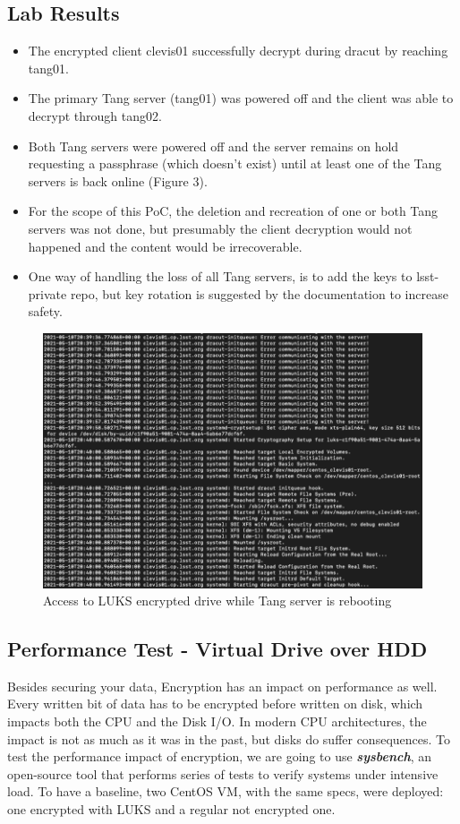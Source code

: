 \newpage
\subsection{Lab Results}
\begin{itemize}
  \item The encrypted client clevis01 successfully decrypt during dracut by reaching tang01.
  \item The primary Tang server (tang01) was powered off and the client was able to decrypt through tang02.
  \item Both Tang servers were powered off and the server remains on hold requesting a passphrase (which doesn't exist) until at least one of the Tang servers is back online (Figure 3).
  \item For the scope of this PoC, the deletion and recreation of one or both Tang servers was not done, but presumably the client decryption would not happened and the content would be irrecoverable.
  \item One way of handling the loss of all Tang servers, is to add the keys to lsst-private repo, but key rotation is suggested by the documentation to increase safety.
\end{itemize}

\begin{figure}
  \includegraphics[width=16cm]{images/image1.png}
  \centering
  \caption{Access to LUKS encrypted drive while Tang server is rebooting}
\end{figure}

\newpage
\subsection{Performance Test - Virtual Drive over HDD}
Besides securing your data, Encryption has an impact on performance as well. Every written bit of data has to be encrypted before written on disk, which impacts both the CPU and the Disk I/O. In modern CPU architectures, the impact is not as much as it was in the past, but disks do suffer consequences.
To test the performance impact of encryption, we are going to use \textbf{\textit{sysbench}}, an open-source tool that performs series of tests to verify systems under intensive load. To have a baseline, two CentOS VM, with the same specs, were deployed: one encrypted with LUKS and a regular not encrypted one.
